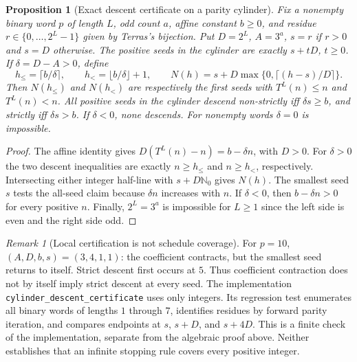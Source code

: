 \documentclass[11pt]{amsart}
\newtheorem{proposition}[theorem]{Proposition}
\theoremstyle{definition}
\theoremstyle{remark}
\newtheorem{remark}[theorem]{Remark}
\begin{document}
\begin{proposition}[Exact descent certificate on a parity cylinder]\label{prop:cylcertificate}
Fix a nonempty binary word $p$ of length $L$, odd count $a$, affine
constant $b\ge0$, and residue $r\in\{0,\ldots,2^L-1\}$ given by
Terras's bijection. Put $D=2^L$, $A=3^a$, $s=r$ if $r>0$ and $s=D$
otherwise. The positive seeds in the cylinder are exactly $s+tD$, $t\ge0$.
If $\delta=D-A>0$, define
\[
h_{\le}=\lceil b/\delta\rceil,\qquad
h_{<}=\lfloor b/\delta\rfloor+1,\qquad
N(h)=s+D\max\{0,\lceil(h-s)/D\rceil\}.
\]
Then $N(h_{\le})$ and $N(h_<)$ are respectively the first seeds with
$T^L(n)\le n$ and $T^L(n)<n$. All positive seeds in the cylinder descend
non-strictly iff $\delta s\ge b$, and strictly iff $\delta s>b$.
If $\delta<0$, none descends. For nonempty words $\delta=0$ is impossible.
\end{proposition}
\begin{proof}
The affine identity gives $D(T^L(n)-n)=b-\delta n$, with $D>0$.
For $\delta>0$ the two descent inequalities are exactly $n\ge h_{\le}$
and $n\ge h_<$, respectively. Intersecting either integer half-line with
$s+D\mathbb N_0$ gives $N(h)$. The smallest seed $s$ tests the all-seed
claim because $\delta n$ increases with $n$. If $\delta<0$, then
$b-\delta n>0$ for every positive $n$. Finally, $2^L=3^a$ is impossible
for $L\ge1$ since the left side is even and the right side odd.
\end{proof}
\begin{remark}[Local certification is not schedule coverage]
For $p=10$, $(A,D,b,s)=(3,4,1,1)$: the coefficient contracts, but the
smallest seed returns to itself. Strict descent first occurs at $5$.
Thus coefficient contraction does not by itself imply strict descent at
every seed. The implementation \texttt{cylinder\_descent\_certificate}
uses only integers. Its regression test enumerates all binary words of
lengths $1$ through $7$, identifies residues by forward parity iteration,
and compares endpoints at $s$, $s+D$, and $s+4D$. This is a finite check
of the implementation, separate from the algebraic proof above. Neither
establishes that an infinite stopping rule covers every positive integer.
\end{remark}
\end{document}
